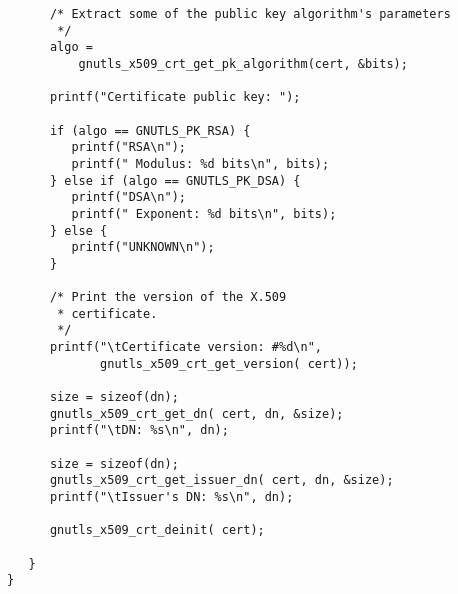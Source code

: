 \begin{verbatim}
      /* Extract some of the public key algorithm's parameters
       */
      algo =
          gnutls_x509_crt_get_pk_algorithm(cert, &bits);

      printf("Certificate public key: ");

      if (algo == GNUTLS_PK_RSA) {
         printf("RSA\n");
         printf(" Modulus: %d bits\n", bits);
      } else if (algo == GNUTLS_PK_DSA) {
         printf("DSA\n");
         printf(" Exponent: %d bits\n", bits);
      } else {
         printf("UNKNOWN\n");
      }

      /* Print the version of the X.509 
       * certificate.
       */
      printf("\tCertificate version: #%d\n",
             gnutls_x509_crt_get_version( cert));

      size = sizeof(dn);
      gnutls_x509_crt_get_dn( cert, dn, &size);
      printf("\tDN: %s\n", dn);

      size = sizeof(dn);
      gnutls_x509_crt_get_issuer_dn( cert, dn, &size);
      printf("\tIssuer's DN: %s\n", dn);

      gnutls_x509_crt_deinit( cert);

   }
}

\end{verbatim}
